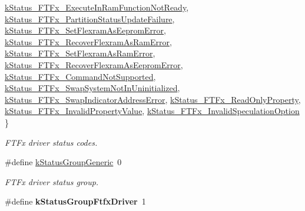 \begin{DoxyCompactItemize}
\mbox{\hyperlink{group__ftfx__controller_gga458e651af6690959efa2afb96be7d609aa2bbcccec94454861492ef0aa0bf1e02}{k\+Status\+\_\+\+F\+T\+Fx\+\_\+\+Execute\+In\+Ram\+Function\+Not\+Ready}}, 
\newline
\mbox{\hyperlink{group__ftfx__controller_gga458e651af6690959efa2afb96be7d609abc388f09a5b298bad7c019b69aa0e6da}{k\+Status\+\_\+\+F\+T\+Fx\+\_\+\+Partition\+Status\+Update\+Failure}}, 
\mbox{\hyperlink{group__ftfx__controller_gga458e651af6690959efa2afb96be7d609af0eda7c88ddc31baed8e52f07181f58e}{k\+Status\+\_\+\+F\+T\+Fx\+\_\+\+Set\+Flexram\+As\+Eeprom\+Error}}, 
\mbox{\hyperlink{group__ftfx__controller_gga458e651af6690959efa2afb96be7d609a641f6139bdfb2ce9ea0ce68ba2606df3}{k\+Status\+\_\+\+F\+T\+Fx\+\_\+\+Recover\+Flexram\+As\+Ram\+Error}}, 
\mbox{\hyperlink{group__ftfx__controller_gga458e651af6690959efa2afb96be7d609a02f24c8d5201a184285ebd46e0134317}{k\+Status\+\_\+\+F\+T\+Fx\+\_\+\+Set\+Flexram\+As\+Ram\+Error}}, 
\newline
\mbox{\hyperlink{group__ftfx__controller_gga458e651af6690959efa2afb96be7d609a72f8274d1d0c96d997cbf60a961d4baf}{k\+Status\+\_\+\+F\+T\+Fx\+\_\+\+Recover\+Flexram\+As\+Eeprom\+Error}}, 
\mbox{\hyperlink{group__ftfx__controller_gga458e651af6690959efa2afb96be7d609acb87ce53590958bf9d32d62ba406f6bf}{k\+Status\+\_\+\+F\+T\+Fx\+\_\+\+Command\+Not\+Supported}}, 
\mbox{\hyperlink{group__ftfx__controller_gga458e651af6690959efa2afb96be7d609aa4951f794d75244ea7c5d071937bbb59}{k\+Status\+\_\+\+F\+T\+Fx\+\_\+\+Swap\+System\+Not\+In\+Uninitialized}}, 
\mbox{\hyperlink{group__ftfx__controller_gga458e651af6690959efa2afb96be7d609ad398459bf841cdc4f501a186b36202d9}{k\+Status\+\_\+\+F\+T\+Fx\+\_\+\+Swap\+Indicator\+Address\+Error}}, 
\newline
\mbox{\hyperlink{group__ftfx__controller_gga458e651af6690959efa2afb96be7d609aa21faddd21ba86841d2edae9cafe89cb}{k\+Status\+\_\+\+F\+T\+Fx\+\_\+\+Read\+Only\+Property}}, 
\mbox{\hyperlink{group__ftfx__controller_gga458e651af6690959efa2afb96be7d609aacb14a9b8a01971fac0c94763d7fb027}{k\+Status\+\_\+\+F\+T\+Fx\+\_\+\+Invalid\+Property\+Value}}, 
\mbox{\hyperlink{group__ftfx__controller_gga458e651af6690959efa2afb96be7d609ab985d0a6c5a30e7bda837a04ce61dcc7}{k\+Status\+\_\+\+F\+T\+Fx\+\_\+\+Invalid\+Speculation\+Option}}
 \}
\begin{DoxyCompactList}\small\item\em F\+T\+Fx driver status codes. \end{DoxyCompactList}\item 
\mbox{\label{group__ftfx__controller_gae148d1f9acb1fee339187aabba151288}} 
\#define \mbox{\hyperlink{group__ftfx__controller_gae148d1f9acb1fee339187aabba151288}{k\+Status\+Group\+Generic}}~0
\begin{DoxyCompactList}\small\item\em F\+T\+Fx driver status group. \end{DoxyCompactList}\item 
\mbox{\label{group__ftfx__controller_gacf3aa7047fb612a07e3f40984da7d183}} 
\#define {\bfseries k\+Status\+Group\+Ftfx\+Driver}~1
\end{DoxyCompactItemize}
